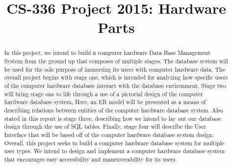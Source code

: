 \documentclass[10pt,conference]{IEEEtran}
\begin{document}
\title{CS-336 Project 2015: Hardware Parts}
\author{
\and
{}
\and
{}
}


\maketitle


\begin{abstract}
\textnormal{
In this project, we intend to build a computer hardware Data Base Management System from the ground up that composes of multiple stages. The database system will be used for the sole purpose of immersing its users with computer hardware data. The overall project begins with stage one, which is intended for analyzing how specific users of the computer hardware database interact with the database environment.  Stage two will bring stage one to life through a use of a pictorial design of the computer hardware database system. Here, an ER model will be presented as a means of describing relations between entities of the computer hardware database system. Also stated in this report is stage three, describing how we intend to lay out our database design through the use of SQL tables. Finally, stage four will describe the User Interface that will be based off of the computer hardware database system design. Overall, this project seeks to build a computer hardware database system for multiple user types. We intend to design and implement a computer hardware database system that encourages easy accessibility and maneuverability for its users. 
}
\end{abstract}

\IEEEpeerreviewmaketitle
%
\end{document}
